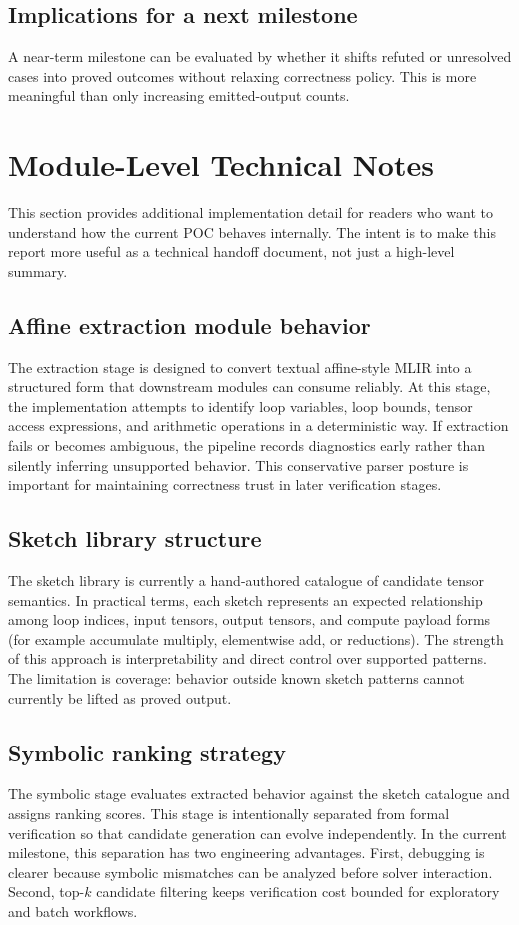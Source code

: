 \documentclass[conference]{IEEEtran}
\begin{document}
\subsection{Implications for a next milestone}
A near-term milestone can be evaluated by whether it shifts refuted or unresolved cases into proved outcomes without relaxing correctness policy. This is more meaningful than only increasing emitted-output counts.

\section{Module-Level Technical Notes}
This section provides additional implementation detail for readers who want to understand how the current POC behaves internally. The intent is to make this report more useful as a technical handoff document, not just a high-level summary.

\subsection{Affine extraction module behavior}
The extraction stage is designed to convert textual affine-style MLIR into a structured form that downstream modules can consume reliably. At this stage, the implementation attempts to identify loop variables, loop bounds, tensor access expressions, and arithmetic operations in a deterministic way. If extraction fails or becomes ambiguous, the pipeline records diagnostics early rather than silently inferring unsupported behavior. This conservative parser posture is important for maintaining correctness trust in later verification stages.

\subsection{Sketch library structure}
The sketch library is currently a hand-authored catalogue of candidate tensor semantics. In practical terms, each sketch represents an expected relationship among loop indices, input tensors, output tensors, and compute payload forms (for example accumulate multiply, elementwise add, or reductions). The strength of this approach is interpretability and direct control over supported patterns. The limitation is coverage: behavior outside known sketch patterns cannot currently be lifted as proved output.

\subsection{Symbolic ranking strategy}
The symbolic stage evaluates extracted behavior against the sketch catalogue and assigns ranking scores. This stage is intentionally separated from formal verification so that candidate generation can evolve independently. In the current milestone, this separation has two engineering advantages. First, debugging is clearer because symbolic mismatches can be analyzed before solver interaction. Second, top-$k$ candidate filtering keeps verification cost bounded for exploratory and batch workflows.
\end{document}
